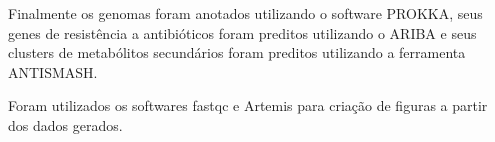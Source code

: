 Finalmente os genomas foram anotados utilizando o software
PROKKA, seus genes de resistência a antibióticos foram preditos utilizando o ARIBA e seus clusters de metabólitos
secundários foram preditos utilizando a ferramenta ANTISMASH.

Foram utilizados os softwares fastqc e Artemis para criação de figuras a partir dos dados gerados.
